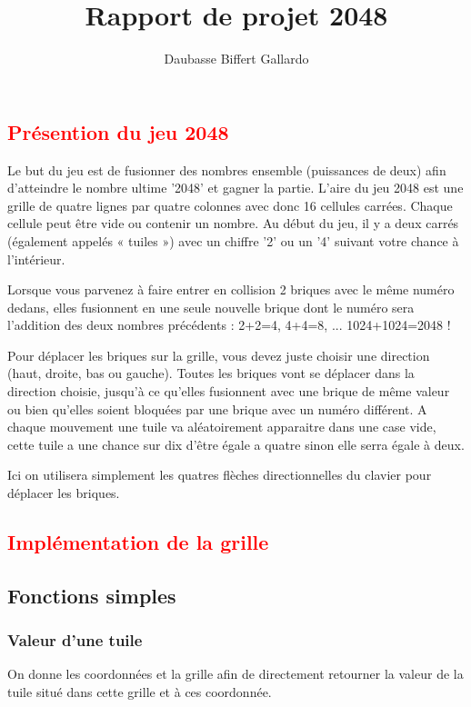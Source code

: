 \documentclass{article}
\title{Rapport de projet 2048}
\author{Daubasse Biffert Gallardo}
\begin{document}
\maketitle
\tableofcontents
\textcolor{red}{\section{Présention du jeu 2048}}

Le but du jeu est de fusionner des nombres ensemble (puissances de deux) afin d'atteindre le nombre ultime '2048' et gagner la partie.
L'aire du jeu 2048 est une grille de quatre lignes par quatre colonnes avec donc 16 cellules carrées. Chaque cellule peut être vide ou contenir un nombre. Au début du jeu, il y a deux carrés (également appelés « tuiles ») avec un chiffre '2' ou un '4' suivant votre chance à l'intérieur. 

Lorsque vous parvenez à faire entrer en collision 2 briques avec le même numéro dedans, elles fusionnent en une seule nouvelle brique dont le numéro sera l'addition des deux nombres précédents : 2+2=4, 4+4=8, ... 1024+1024=2048 !

Pour déplacer les briques sur la grille, vous devez juste choisir une direction (haut, droite, bas ou gauche). Toutes les briques vont se déplacer dans la direction choisie, jusqu'à ce qu'elles fusionnent avec une brique de même valeur ou bien qu'elles soient bloquées par une brique avec un numéro différent. A chaque mouvement une tuile va aléatoirement apparaitre dans une case vide, cette tuile a une chance sur dix d'être égale a quatre sinon elle serra égale à deux.

Ici on utilisera simplement les quatres flèches directionnelles du clavier pour déplacer les briques.

\textcolor{red}{\section{Implémentation de la grille}}

\subsection{Fonctions simples}

\subsubsection{Valeur d'une tuile}

On donne les coordonnées et la grille afin de directement retourner la valeur de la tuile situé dans cette grille et à ces coordonnée.
\end{document}
